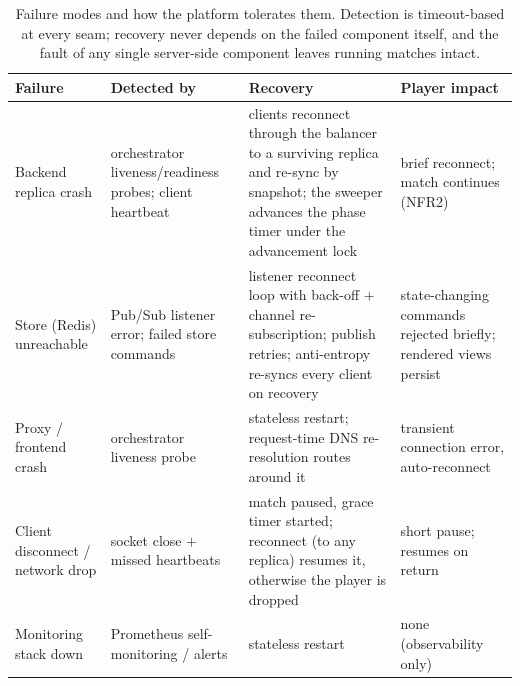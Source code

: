 \documentclass{scrartcl}
\begin{document}
\begin{table}
      \centering
      \footnotesize
      \setlength{\tabcolsep}{6pt}
      \renewcommand{\arraystretch}{1.3}
      \caption{Failure modes and how the platform tolerates them. Detection is
            timeout-based at every seam; recovery never depends on the failed component
            itself, and the fault of any single server-side component leaves running
            matches intact.}
      \label{tab:failure-modes}
      \begin{tabular}{@{}
            >{\raggedright\arraybackslash}p{2.4cm}
            >{\raggedright\arraybackslash}p{3.1cm}
            >{\raggedright\arraybackslash}p{4.8cm}
            >{\raggedright\arraybackslash}p{2.6cm}@{}}
            \toprule
            \textbf{Failure} & \textbf{Detected by}                                                       & \textbf{Recovery}
                             & \textbf{Player impact}                                                                         \\
            \midrule
            Backend replica crash
                             & orchestrator liveness/readiness probes; client heartbeat
                             & clients reconnect through the balancer to a surviving replica and re-sync
            by snapshot; the sweeper advances the phase timer under the advancement
            lock
                             & brief reconnect; match continues (NFR2)                                                        \\
            Store (Redis) unreachable
                             & Pub/Sub listener error; failed store commands
                             & listener reconnect loop with back-off $+$ channel re-subscription; publish
            retries; anti-entropy re-syncs every client on recovery
                             & state-changing commands rejected briefly; rendered views persist                               \\
            Proxy / frontend crash
                             & orchestrator liveness probe
                             & stateless restart; request-time DNS re-resolution routes around it
                             & transient connection error, auto-reconnect                                                     \\
            Client disconnect / network drop
                             & socket close $+$ missed heartbeats
                             & match paused, grace timer started; reconnect (to any replica) resumes it,
            otherwise the player is dropped
                             & short pause; resumes on return                                                                 \\
            Monitoring stack down
                             & Prometheus self-monitoring / alerts
                             & stateless restart
                             & none (observability only)                                                                      \\
            \bottomrule
      \end{tabular}
\end{table}
\end{document}
